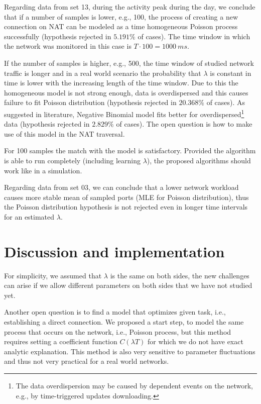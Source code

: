 \documentclass{llncs}
\begin{document}
Regarding data from set 13, during the activity peak during the day, we conclude that if a number of samples 
is lower, e.g., 100, the process of creating a new connection on NAT can 
be modeled as a time homogeneous Poisson process successfully (hypothesis rejected in $5.191\%$ of cases).
The time window in which the network was monitored in this case is $T \cdot 100 = 1000~ms$. 

If the number of samples is higher, e.g., 500, the time window of studied network traffic is longer and
in a real world scenario the probability that $\lambda$ is constant in time is lower with the increasing length of the time
window. Due to this the homogeneous model is not strong enough, data is 
overdispersed and this causes failure to fit Poisson distribution (hypothesis rejected in $20.368\%$ of cases). As suggested
in literature, Negative Binomial model fits better for overdispersed\footnote{The data overdispersion may be caused by dependent events on the network, e.g., by time-triggered updates downloading.}
data (hypothesis rejected in $2.829\%$ of cases). 
The open question is how to make use of this model in the NAT traversal.

For 100 samples the match with the model is satisfactory. Provided the algorithm is able to run completely (including learning $\lambda$), the proposed algorithms should work like in a simulation.

Regarding data from set 03, we can conclude that a lower network workload causes more stable mean of sampled ports (MLE for Poisson distribution), thus the Poisson distribution hypothesis is not rejected even in longer time intervals for an estimated $\lambda$. 


\section{Discussion and implementation}
For simplicity, we assumed that $\lambda$ is the same on both sides, the new challenges 
can arise if we allow different parameters on both sides that we have not studied yet.

Another open question is to find a model that optimizes given task, i.e., establishing a direct
connection. We proposed a start step, to model the same process that occurs on the network, i.e.,
Poisson process, but this method requires setting a coefficient function $C(\lambda T)$ for which 
we do not have exact analytic explanation. This method is also very sensitive to parameter fluctuations
and thus not very practical for a real world networks. 
\end{document}
